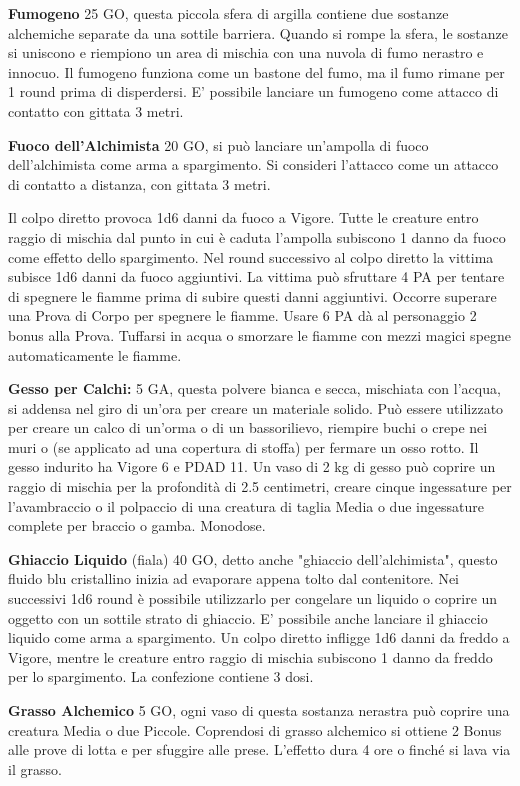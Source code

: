 \documentclass[12pt,a4paper,twoside,openany]{book}
\begin{document}
\begin{multicols}{2}
\textbf{Fumogeno} 25 GO, questa piccola sfera di argilla contiene due sostanze alchemiche separate da una sottile barriera. Quando si rompe la sfera, le sostanze si uniscono e riempiono un area di mischia con una nuvola di fumo nerastro e innocuo. Il fumogeno funziona come un bastone del fumo, ma il fumo rimane per 1 round prima di disperdersi. E' possibile lanciare un fumogeno come attacco di contatto con gittata 3 metri.

\textbf{Fuoco dell'Alchimista} 20 GO, si può lanciare un'ampolla di fuoco dell'alchimista come arma a spargimento. Si consideri l'attacco come un attacco di contatto a distanza, con gittata 3 metri.

Il colpo diretto provoca 1d6 danni da fuoco a Vigore. Tutte le creature entro raggio di mischia dal punto in cui è caduta l'ampolla subiscono 1 danno da fuoco come effetto dello spargimento. Nel round successivo al colpo diretto la vittima subisce 1d6 danni da fuoco aggiuntivi. La vittima può sfruttare 4 PA per tentare di spegnere le fiamme prima di subire questi danni aggiuntivi. Occorre superare una Prova di Corpo per spegnere le fiamme. Usare 6 PA dà al personaggio 2 bonus alla Prova. Tuffarsi in acqua o smorzare le fiamme con mezzi magici spegne automaticamente le fiamme.

\textbf{Gesso per Calchi:} 5 GA, questa polvere bianca e secca, mischiata con l'acqua, si addensa nel giro di un'ora per creare un materiale solido. Può essere utilizzato per creare un calco di un'orma o di un bassorilievo, riempire buchi o crepe nei muri o (se applicato ad una copertura di stoffa) per fermare un osso rotto. Il gesso indurito ha Vigore 6 e PDAD 11. Un vaso di 2 kg di gesso può coprire un raggio di mischia per la profondità di 2.5 centimetri, creare cinque ingessature per l'avambraccio o il polpaccio di una creatura di taglia Media o due ingessature complete per braccio o gamba. Monodose.

\textbf{Ghiaccio Liquido} (fiala) 40 GO, detto anche "ghiaccio dell'alchimista", questo fluido blu cristallino inizia ad evaporare appena tolto dal contenitore. Nei successivi 1d6 round è possibile utilizzarlo per congelare un liquido o coprire un oggetto con un sottile strato di ghiaccio. E' possibile anche lanciare il ghiaccio liquido come arma a spargimento. Un colpo diretto infligge 1d6 danni da freddo a Vigore, mentre le creature entro raggio di mischia subiscono 1 danno da freddo per lo spargimento. La confezione contiene 3 dosi.

\textbf{Grasso Alchemico} 5 GO, ogni vaso di questa sostanza nerastra può coprire una creatura Media o due Piccole. Coprendosi di grasso alchemico si ottiene 2 Bonus alle prove di lotta e per sfuggire alle prese. L'effetto dura 4 ore o finché si lava via il grasso.


\end{multicols}
\end{document}

